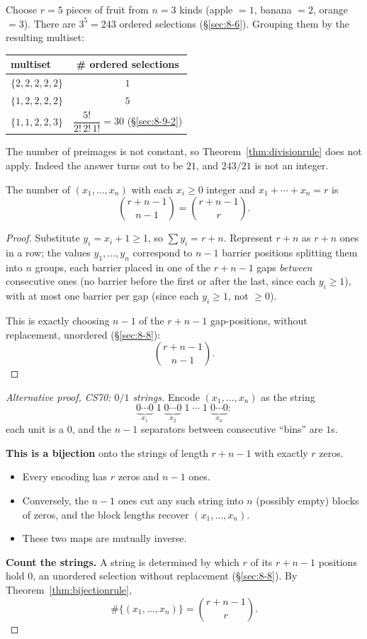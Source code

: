 \documentclass[11pt]{article}
\begin{document}
\begin{example}
Choose $r=5$ pieces of fruit from $n=3$ kinds (apple $=1$, banana $=2$, orange $=3$). There are $3^5=243$ ordered selections (\S\ref{sec:8-6}). Grouping them by the resulting multiset:
\begin{center}
\begin{tabular}{l|c}
multiset & \# ordered selections \\ \hline
$\{2,2,2,2,2\}$ & $1$ \\
$\{1,2,2,2,2\}$ & $5$ \\
$\{1,1,2,2,3\}$ & $\dfrac{5!}{2!\,2!\,1!}=30$ \quad (\S\ref{sec:8-9-2})
\end{tabular}
\end{center}
The number of preimages is not constant, so Theorem~\ref{thm:divisionrule} does not apply. Indeed the answer turns out to be $21$, and $243/21$ is not an integer.
\end{example}

\begin{theorem}
The number of $(x_1,\dots,x_n)$ with each $x_i\ge0$ integer and $x_1+\cdots+x_n=r$ is
\[
\binom{r+n-1}{n-1} = \binom{r+n-1}{r}.
\]
\end{theorem}
\begin{proof}
Substitute $y_i=x_i+1\ge1$, so $\sum y_i = r+n$. Represent $r+n$ as $r+n$ ones in a row; the values $y_1,\dots,y_n$ correspond to $n-1$ barrier positions splitting them into $n$ groups, each barrier placed in one of the $r+n-1$ gaps \emph{between} consecutive ones (no barrier before the first or after the last, since each $y_i\ge1$), with at most one barrier per gap (since each $y_i\ge1$, not $\ge0$).

This is exactly choosing $n-1$ of the $r+n-1$ gap-positions, without replacement, unordered (\S\ref{sec:8-8}):
\[
\binom{r+n-1}{n-1}.
\]
\end{proof}

\begin{proof}[Alternative proof, CS70: $0/1$ strings]
Encode $(x_1,\dots,x_n)$ as the string
\[
\underbrace{0\cdots0}_{x_1}\;1\;\underbrace{0\cdots0}_{x_2}\;1\;\cdots\;1\;\underbrace{0\cdots0}_{x_n}:
\]
each unit is a $0$, and the $n-1$ separators between consecutive ``bins'' are $1$s.

\medskip
\textbf{This is a bijection} onto the strings of length $r+n-1$ with exactly $r$ zeros.
\begin{itemize}
  \item Every encoding has $r$ zeros and $n-1$ ones.
  \item Conversely, the $n-1$ ones cut any such string into $n$ (possibly empty) blocks of zeros, and the block lengths recover $(x_1,\dots,x_n)$.
  \item These two maps are mutually inverse.
\end{itemize}

\medskip
\textbf{Count the strings.} A string is determined by which $r$ of its $r+n-1$ positions hold $0$, an unordered selection without replacement (\S\ref{sec:8-8}). By Theorem~\ref{thm:bijectionrule},
\[
\#\{(x_1,\dots,x_n)\} = \binom{r+n-1}{r}.
\]
\end{proof}
\end{document}
